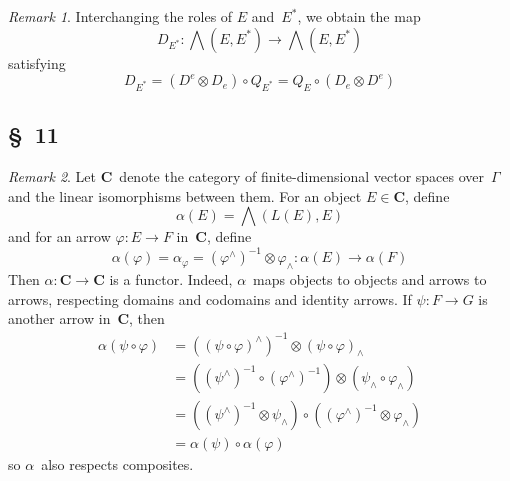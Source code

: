 \documentclass[letterpaper,12pt]{article}
\newcommand{\after}{\circ}
\newcommand{\tprod}{\otimes}
\newcommand{\eprod}{\wedge}
\newcommand{\bigeprod}{\bigwedge}
\newcommand{\medeprod}{{\textstyle\bigeprod}}
\newcommand{\cat}[1]{\mathbf{#1}}
\theoremstyle{definition}
\theoremstyle{remark}
\newtheorem*{rmk}{Remark}
\begin{document}
\begin{rmk}
Interchanging the roles of \(E\) and~\(E^*\), we obtain the map
\[D_{E^*}:\medeprod(E,E^*)\to\medeprod(E,E^*)\]
satisfying
\[D_{E^*}=(D^e\tprod D_e)\after Q_{E^*}=Q_E\after(D_e\tprod D^e)\]
\end{rmk}

\subsection*{\S~11}
\begin{rmk}
Let \(\cat{C}\)~denote the category of finite-dimensional vector spaces over~\(\Gamma\) and the linear isomorphisms between them. For an object \(E\in\cat{C}\), define
\[\alpha(E)=\medeprod(L(E),E)\]
and for an arrow \(\varphi:E\to F\) in~\(\cat{C}\), define
\[\alpha(\varphi)=\alpha_{\varphi}=(\varphi^{\eprod})^{-1}\tprod\varphi_{\eprod}:\alpha(E)\to\alpha(F)\]
Then \(\alpha:\cat{C}\to\cat{C}\) is a functor. Indeed, \(\alpha\)~maps objects to objects and arrows to arrows, respecting domains and codomains and identity arrows. If \(\psi:F\to G\) is another arrow in~\(\cat{C}\), then
\begin{align*}
\alpha(\psi\after\varphi)&=((\psi\after\varphi)^{\eprod})^{-1}\tprod(\psi\after\varphi)_{\eprod}\\
	&=((\psi^{\eprod})^{-1}\after(\varphi^{\eprod})^{-1})\tprod(\psi_{\eprod}\after\varphi_{\eprod})\\
	&=((\psi^{\eprod})^{-1}\tprod\psi_{\eprod})\after((\varphi^{\eprod})^{-1}\tprod\varphi_{\eprod})\\
	&=\alpha(\psi)\after\alpha(\varphi)
\end{align*}
so \(\alpha\)~also respects composites.


\end{rmk}
\end{document}
